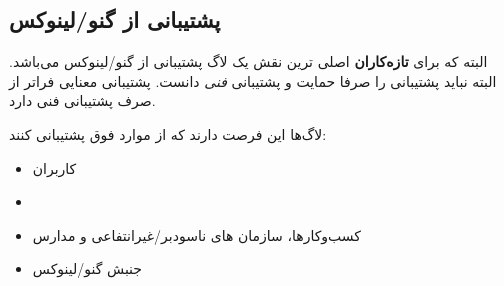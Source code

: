 
\subsection{پشتیبانی از گنو/لینوکس }

البته که برای
{\bfseries تازه‌کاران}
اصلی ترین نقش یک لاگ پشتیبانی از گنو/لینوکس می‌باشد.
البته نباید پشتیبانی را صرفا حمایت و پشتیبانی
{\itshape فنی}
دانست. پشتیبانی معنایی فراتر از صرف پشتیبانی فنی دارد.

لاگ‌ها این فرصت دارند که از موارد فوق پشتیبانی کنند:

\begin{itemize}
\item
کاربران
\item {}
\item
کسب‌وکارها، سازمان های ناسودبر/غیرانتفاعی و مدارس
\item
جنبش گنو/لینوکس
\end{itemize}


